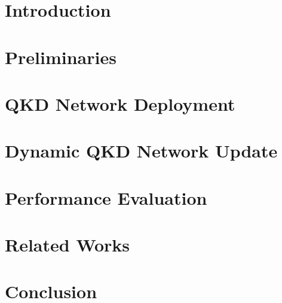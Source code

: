 \documentclass[10pt,conference,compsocconf,letterpaper]{IEEEtran}
\begin{document}
\section{Introduction}\label{sec:intro}



%


\section{Preliminaries}\label{sec:prelim}



\section{QKD Network Deployment}\label{sec:deployment}



\section{Dynamic QKD Network Update}\label{sec:dynamicupdate}



\section{Performance Evaluation}\label{sec:evaluation}



\section{Related Works}\label{sec:relwork}



\section{Conclusion}\label{sec:conclusion}



\end{document}
